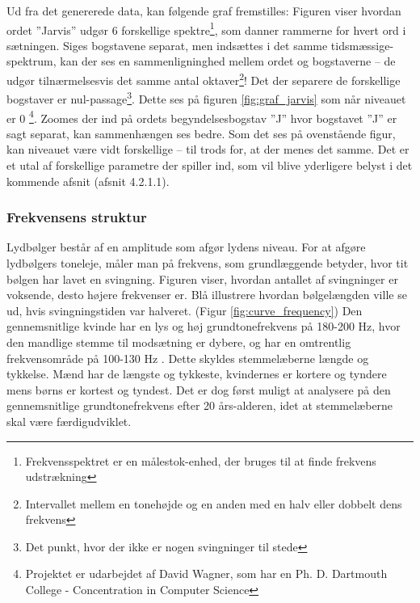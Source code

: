 Ud fra det genererede data, kan følgende graf fremstilles:
Figuren viser hvordan ordet ”Jarvis” udgør 6 forskellige spektre\footnote{Frekvensspektret er en målestok-enhed, der bruges til at finde frekvens udstrækning}, som danner rammerne for hvert ord i sætningen. Siges bogstavene separat, men indsættes i det samme tidsmæssige-spektrum, kan der ses en sammenligninghed mellem ordet og bogstaverne – de udgør tilnærmelsesvis det samme antal oktaver\footnote{Intervallet mellem en tonehøjde og en anden med en halv eller dobbelt dens frekvens}! Det der separere de forskellige bogstaver er nul-passage\footnote{Det punkt, hvor der ikke er nogen svingninger til stede}. Dette ses på figuren \ref{fig:graf_jarvis} som når niveauet er 0 \cite{VoiceProject}\footnote{Projektet er udarbejdet af David Wagner, som har en Ph. D. Dartmouth College - Concentration in Computer Science}. \clearpage
Zoomes der ind på ordets begyndelsesbogstav ”J” hvor bogstavet ”J” er sagt separat, kan sammenhængen ses bedre.
Som det ses på ovenstående figur, kan niveauet være vidt forskellige – til trods for, at der menes det samme. Det er et utal af forskellige parametre der spiller ind, som vil blive yderligere belyst i det kommende afsnit (afsnit 4.2.1.1). 
\clearpage
\subsubsection{Frekvensens struktur}
\label{sec:frekvensens_struktur}
Lydbølger består af en amplitude som afgør lydens niveau. For at afgøre lydbølgers toneleje, måler man på frekvens, som grundlæggende betyder, hvor tit bølgen har lavet en svingning. Figuren viser, hvordan antallet af svingninger er voksende, desto højere frekvenser er. Blå illustrere hvordan bølgelængden ville se ud, hvis svingningstiden var halveret. (Figur \ref{fig:curve_frequency})
Den gennemsnitlige kvinde har en lys og høj grundtonefrekvens på 180-200 Hz, hvor den mandlige stemme til modsætning er dybere, og har en omtrentlig frekvensområde på 100-130 Hz \cite{Stemme}. Dette skyldes stemmelæberne længde og tykkelse. Mænd har de længste og tykkeste, kvindernes er kortere og tyndere mens børns er kortest og tyndest. Det er dog først muligt at analysere på den gennemsnitlige grundtonefrekvens efter 20 års-alderen, idet at stemmelæberne skal være færdigudviklet.\\

